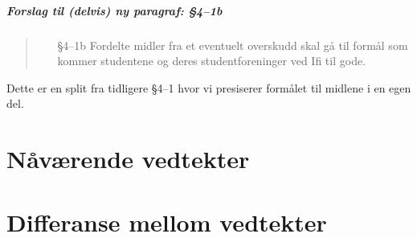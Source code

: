 \documentclass[10pt,norsk,a4paper]{article}
\begin{document}
\subsubsection{Forslag til (delvis) ny paragraf: §4--1b}
\begin{quote}
	\begin{enumerate}
		\item[§4--1b] Fordelte midler fra et eventuelt overskudd skal gå til formål som kommer studentene og deres studentforeninger ved Ifi til gode.
	\end{enumerate}
\end{quote}\label{lastpage}
Dette er en split fra tidligere §4--1 hvor vi presiserer formålet til midlene i en egen del.

\newpage
\part{Nåværende vedtekter}

\part{Differanse mellom vedtekter}

\end{document}
